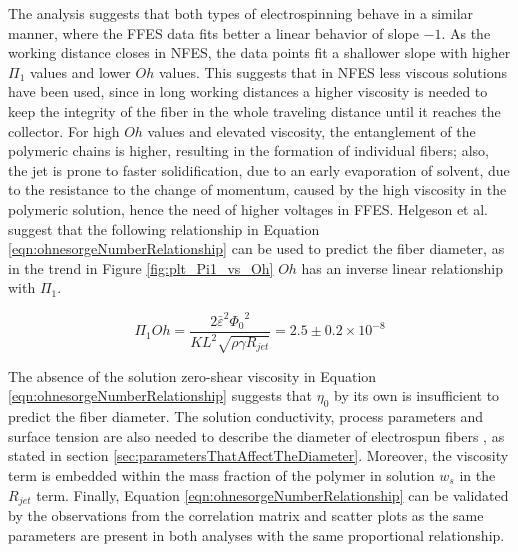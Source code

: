 The analysis suggests that both types of electrospinning behave in a similar manner, where the FFES data fits better a linear behavior of slope $-1$. As the working distance closes in NFES, the data points fit a shallower slope with higher $\Pi_1$ values and lower $Oh$ values. This suggests that in NFES less viscous solutions have been used, since in long working distances a higher viscosity is needed to keep the integrity of the fiber in the whole traveling distance until it reaches the collector. For high $Oh$ values and elevated viscosity, the entanglement of the polymeric chains is higher, resulting in the formation of individual fibers; also, the jet is prone to faster solidification, due to an early evaporation of solvent, due to the resistance to the change of momentum, caused by the high viscosity in the polymeric solution, hence the need of higher voltages in FFES. Helgeson et al. suggest that the following relationship in Equation \ref{eqn:ohnesorgeNumberRelationship} can be used to predict the fiber diameter, as in the trend in Figure \ref{fig:plt_Pi1_vs_Oh} $Oh$ has an inverse linear relationship with $\Pi_1$. \cite{Helgeson2007}

\begin{equation}\label{eqn:ohnesorgeNumberRelationship}
    \Pi_1 Oh = \frac{2 {\bar{\varepsilon}}^2 {\Phi_0}^2}{K L^2 \sqrt{\rho \gamma R_{jet}}} = 2.5 \pm 0.2 \times 10^{-8}
\end{equation}

The absence of the solution zero-shear viscosity in Equation \ref{eqn:ohnesorgeNumberRelationship} suggests that $\eta_0$ by its own is insufficient to predict the fiber diameter. The solution conductivity, process parameters and surface tension are also needed to describe the diameter of electrospun fibers \cite{Helgeson2007}, as stated in section \ref{sec:parametersThatAffectTheDiameter}. Moreover, the viscosity term is embedded within the mass fraction of the polymer in solution $w_s$ in the $R_{jet}$ term. Finally, Equation \ref{eqn:ohnesorgeNumberRelationship} can be validated by the observations from the correlation matrix and scatter plots as the same parameters are present in both analyses with the same proportional relationship.